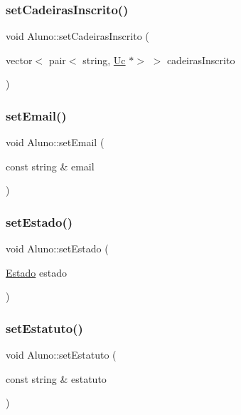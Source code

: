 \hypertarget{class_aluno_a998361a645330ab98133ebaeb2e62058}{}\label{class_aluno_a998361a645330ab98133ebaeb2e62058} 
\subsubsection{\texorpdfstring{set\+Cadeiras\+Inscrito()}{setCadeirasInscrito()}}
{\footnotesize\ttfamily void Aluno\+::set\+Cadeiras\+Inscrito (\begin{DoxyParamCaption}\item[{vector$<$ pair$<$ string, \hyperlink{class_uc}{Uc} $\ast$$>$ $>$}]{cadeiras\+Inscrito }\end{DoxyParamCaption})}

\hypertarget{class_aluno_a45246f0bd15a445e11dae4cccc231984}{}\label{class_aluno_a45246f0bd15a445e11dae4cccc231984} 
\subsubsection{\texorpdfstring{set\+Email()}{setEmail()}}
{\footnotesize\ttfamily void Aluno\+::set\+Email (\begin{DoxyParamCaption}\item[{const string \&}]{email }\end{DoxyParamCaption})}

\hypertarget{class_aluno_a7786eb123c2bc7bcdf3ea14432ffdadd}{}\label{class_aluno_a7786eb123c2bc7bcdf3ea14432ffdadd} 
\subsubsection{\texorpdfstring{set\+Estado()}{setEstado()}}
{\footnotesize\ttfamily void Aluno\+::set\+Estado (\begin{DoxyParamCaption}\item[{\hyperlink{aluno_8h_a9d4630b1e0c310d9b8c562abd8114c49}{Estado}}]{estado }\end{DoxyParamCaption})}

\hypertarget{class_aluno_a4bac5fc524532359adb4a61388e6b348}{}\label{class_aluno_a4bac5fc524532359adb4a61388e6b348} 
\subsubsection{\texorpdfstring{set\+Estatuto()}{setEstatuto()}}
{\footnotesize\ttfamily void Aluno\+::set\+Estatuto (\begin{DoxyParamCaption}\item[{const string \&}]{estatuto }\end{DoxyParamCaption})}

